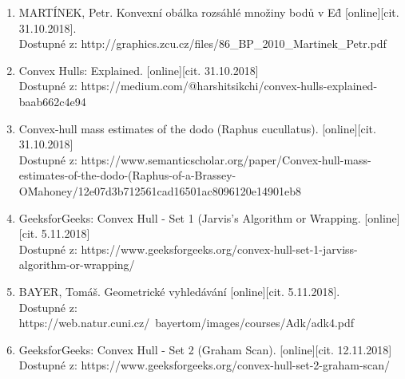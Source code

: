 \documentclass[a4paper, 12pt]{article}
\begin{document}
\begin{enumerate}
\item  MARTÍNEK, Petr. Konvexní obálka rozsáhlé množiny bodů v E\^d [online][cit. 31.10.2018]. \\
Dostupné z: http://graphics.zcu.cz/files/86\_BP\_2010\_Martinek\_Petr.pdf  \\

\item Convex Hulls: Explained. [online][cit. 31.10.2018]\\
Dostupné z: https://medium.com/@harshitsikchi/convex-hulls-explained-baab662c4e94\\

\item Convex-hull mass estimates of the dodo (Raphus cucullatus). [online][cit. 31.10.2018]\\
Dostupné z: https://www.semanticscholar.org/paper/Convex-hull-mass-estimates-of-the-dodo-(Raphus-of-a-Brassey-O\'Mahoney/12e07d3b712561cad16501ac8096120e14901eb8

\item GeeksforGeeks: Convex Hull - Set 1 (Jarvis's Algorithm or Wrapping. [online][cit. 5.11.2018]\\
Dostupné z: https://www.geeksforgeeks.org/convex-hull-set-1-jarviss-algorithm-or-wrapping/

\item  BAYER, Tomáš. Geometrické vyhledávání [online][cit. 5.11.2018]. \\
Dostupné z: https://web.natur.cuni.cz/~bayertom/images/courses/Adk/adk4.pdf  \\

\item GeeksforGeeks: Convex Hull - Set 2 (Graham Scan). [online][cit. 12.11.2018]\\
Dostupné z: https://www.geeksforgeeks.org/convex-hull-set-2-graham-scan/



\end{enumerate}
\end{document}

